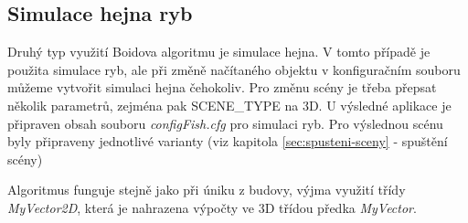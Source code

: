 \documentclass[czech,public,dept460,male,cpdeclaration]{diploma}
\begin{document}
\newpage




\newpage

\subsection{Simulace hejna ryb}
Druhý typ využití Boidova algoritmu je simulace hejna. V tomto případě je použita simulace ryb, ale při změně načítaného objektu v konfiguračním souboru můžeme vytvořit simulaci hejna čehokoliv. Pro změnu scény je třeba přepsat několik parametrů, zejména pak SCENE\_TYPE na 3D. U výsledné aplikace je připraven obsah souboru \textit{configFish.cfg} pro simulaci ryb. Pro výslednou scénu byly připraveny jednotlivé varianty (viz kapitola \ref{sec:spusteni-sceny} - spuštění scény)

Algoritmus funguje stejně jako při úniku z budovy, výjma využití třídy \textit{MyVector2D}, která je nahrazena výpočty ve 3D třídou předka \textit{MyVector}.
\end{document}
